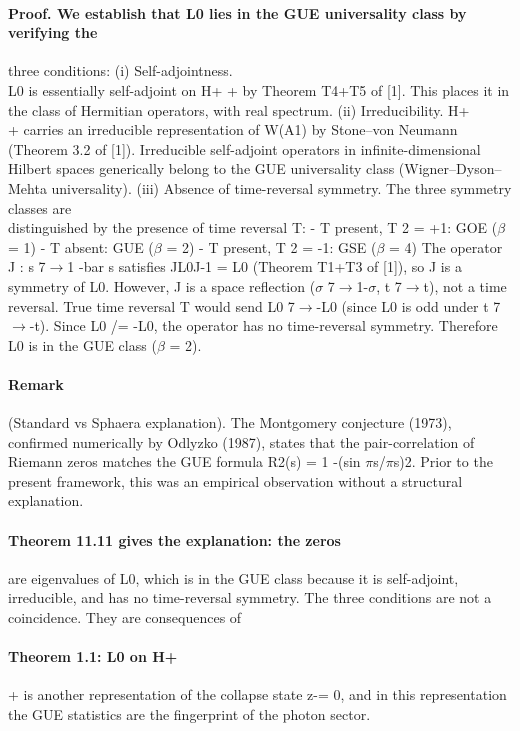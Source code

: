\documentclass[12pt,a4paper]{article}
\begin{document}
\paragraph*{Proof. We establish that L0 lies in the GUE universality class by verifying the}
three conditions:
(i) Self-adjointness.\\
L0 is essentially self-adjoint on H+ + by Theorem T4+T5 of [1]. This places it in the class of Hermitian operators, with real spectrum.
(ii) Irreducibility. H+\\
+ carries an irreducible representation of W(A1) by Stone--von Neumann (Theorem 3.2 of [1]). Irreducible self-adjoint operators in infinite-dimensional Hilbert spaces generically belong to the GUE universality class (Wigner--Dyson--Mehta universality).
(iii) Absence of time-reversal symmetry. The three symmetry classes are\\
distinguished by the presence of time reversal T:
- T present, T 2 = +1: GOE ($\beta$ = 1)
- T absent: GUE ($\beta$ = 2)
- T present, T 2 = -1: GSE ($\beta$ = 4)
The operator J : s 7$\to$1 -bar s satisfies JL0J-1 = L0 (Theorem T1+T3 of [1]), so J is a symmetry of L0. However, J is a space reflection ($\sigma$ 7$\to$1-$\sigma$, t 7$\to$t), not a time reversal. True time reversal T would send L0 7$\to$-L0 (since L0 is odd under t 7$\to$-t). Since L0 /= -L0, the operator has no time-reversal symmetry. Therefore L0 is in the GUE class ($\beta$ = 2).
\paragraph*{Remark}
(Standard vs Sphaera explanation). The Montgomery conjecture (1973), confirmed numerically by Odlyzko (1987), states that the pair-correlation of Riemann zeros matches the GUE formula R2(s) = 1 -(sin $\pi$s/$\pi$s)2. Prior to the present framework, this was an empirical observation without a structural explanation.
\paragraph*{Theorem 11.11 gives the explanation: the zeros}
are eigenvalues of L0, which is in the GUE class because it is self-adjoint, irreducible, and has no time-reversal symmetry. The three conditions are not a coincidence. They are consequences of
\paragraph*{Theorem 1.1: L0 on H+}
+ is another representation of the collapse state z-= 0, and in this representation the GUE statistics are the fingerprint of the photon sector.
\end{document}
